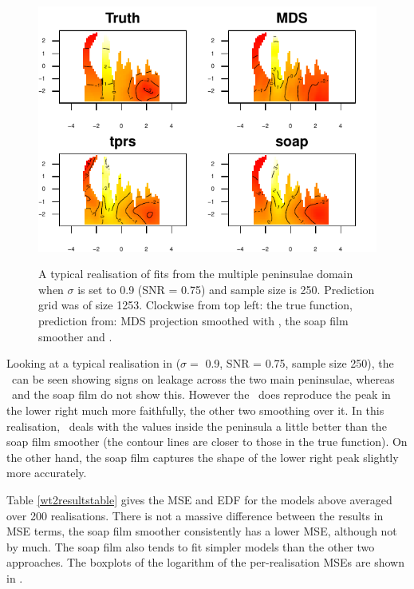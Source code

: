 {%
\begin{figure}
\centering
\includegraphics[width=6in]{mds/figs/wt2-comp-09.pdf} \\
\caption{A typical realisation of fits from the multiple peninsulae domain when $\sigma$ is set to 0.9 (SNR = 0.75) and sample size is 250. Prediction grid was of size 1253. Clockwise from top left: the true function, prediction from: MDS projection smoothed with \tprs, the soap film smoother and \tprs.}
\label{wt2-comp-0.9}
\end{figure}

Looking at a typical realisation in  ($\sigma=$ 0.9, SNR = 0.75, sample size 250), the \tprs\ can be seen showing signs on leakage across the two main peninsulae, whereas \mdsap\ and the soap film do not show this. However the \tprs\ does reproduce the peak in the lower right much more faithfully, the other two smoothing over it. In this realisation, \mdsap\ deals with the values inside the peninsula a little better than the soap film smoother (the contour lines are closer to those in the true function). On the other hand, the soap film captures the shape of the lower right peak slightly more accurately.

Table \ref{wt2resultstable} gives the MSE and EDF for the models above averaged over 200 realisations. There is not a massive difference between the results in MSE terms, the soap film smoother consistently has a lower MSE, although not by much. The soap film also tends to fit simpler models than the other two approaches. The boxplots of the logarithm of the per-realisation MSEs are shown in .

}
